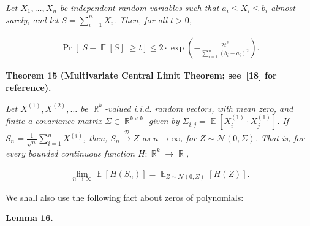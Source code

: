 \documentclass[10pt,a4paper]{article}
\begin{document}
\emph{Let $X_{1},\dots,X_{n}$ be independent random variables such that $a_{i}\leqslant X_{i}\leqslant b_{i}$ almost surely, and let $S=\sum_{i=1}^{n}X_{i}$.
Then, for all $t>0$,}\par


\[\begin{gathered}
\Pr\left[\left|S-\mathop{\mathbb{E}}\left[S\right]\right|\geqslant t\right]\leqslant 2\cdot\exp\left(-\frac{2t^{2}}{\sum_{i=1}^{n}\left(b_{i}-a_{i}\right)^{2}}\right).
\end{gathered}\]







\par\medskip\noindent\textbf{
\textbf{Theorem 15}\textbf{ }(Multivariate Central Limit Theorem; see [18] for reference)\textbf{.}
}\par



\emph{Let $X^{\left(1\right)},X^{\left(2\right)},\dots$ be $\mathop{\mathbb{R}}^{k}$-valued i.i.d. random vectors, with mean zero, and finite a covariance matrix $\Sigma\in\mathop{\mathbb{R}}^{k\times k}$ given by $\Sigma_{i,j}=\mathop{\mathbb{E}}\left[X^{\left(1\right)}_{i}\cdot X^{\left(1\right)}_{j}\right]$.
If $S_{n}=\frac{1}{\sqrt{n}}\sum_{i=1}^{n}X^{\left(i\right)}$, then, $S_{n}\xrightarrow{\mathcal{D}}Z$ as $n\to\infty$, for $Z\sim\mathcal{N}(0,\Sigma)$.
That is, for every bounded continuous function $H:\mathop{\mathbb{R}}^{k}\to\mathop{\mathbb{R}}$,}\par


\[\begin{gathered}
\lim_{n\to\infty}\mathop{\mathbb{E}}\left[H(S_{n})\right]=\mathop{\mathbb{E}}_{Z\sim\mathcal{N}(0,\Sigma)}\left[H(Z)\right].
\end{gathered}\]






We shall also use the following fact about zeros of polynomials:\par





\par\medskip\noindent\textbf{
\textbf{Lemma 16}\textbf{.}
}\par
\end{document}
